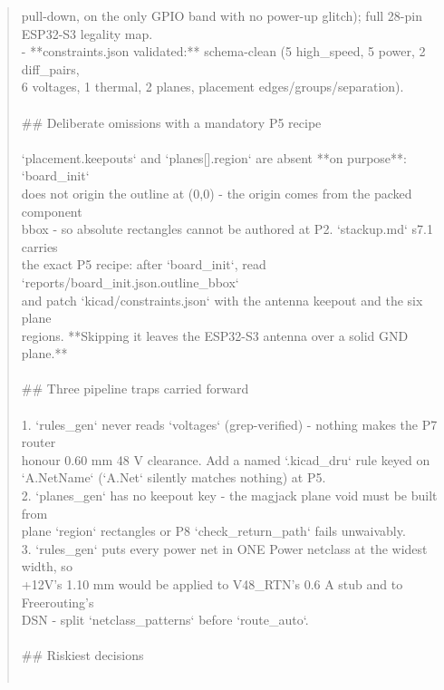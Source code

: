 \documentclass[11pt,a4paper]{article}
\begin{document}
\begin{quote}
  pull-down, on the only GPIO band with no power-up glitch); full 28-pin\\
  ESP32-S3 legality map.\\
- {*}{*}constraints.json validated:{*}{*} schema-clean (5 high\_speed, 5 power, 2 diff\_pairs,\\
  6 voltages, 1 thermal, 2 planes, placement edges/groups/separation).\\
~\\
\#\# Deliberate omissions with a mandatory P5 recipe\\
~\\
`placement.keepouts` and `planes{[}{]}.region` are absent {*}{*}on purpose{*}{*}: `board\_init`\\
does not origin the outline at (0,0) - the origin comes from the packed component\\
bbox - so absolute rectangles cannot be authored at P2. `stackup.md` s7.1 carries\\
the exact P5 recipe: after `board\_init`, read `reports/board\_init.json.outline\_bbox`\\
and patch `kicad/constraints.json` with the antenna keepout and the six plane\\
regions. {*}{*}Skipping it leaves the ESP32-S3 antenna over a solid GND plane.{*}{*}\\
~\\
\#\# Three pipeline traps carried forward\\
~\\
1. `rules\_gen` never reads `voltages` (grep-verified) - nothing makes the P7 router\\
   honour 0.60 mm 48 V clearance. Add a named `.kicad\_dru` rule keyed on\\
   `A.NetName` (`A.Net` silently matches nothing) at P5.\\
2. `planes\_gen` has no keepout key - the magjack plane void must be built from\\
   plane `region` rectangles or P8 `check\_return\_path` fails unwaivably.\\
3. `rules\_gen` puts every power net in ONE Power netclass at the widest width, so\\
   +12V's 1.10 mm would be applied to V48\_RTN's 0.6 A stub and to Freerouting's\\
   DSN - split `netclass\_patterns` before `route\_auto`.\\
~\\
\#\# Riskiest decisions\\
~\\

\end{quote}
\end{document}
